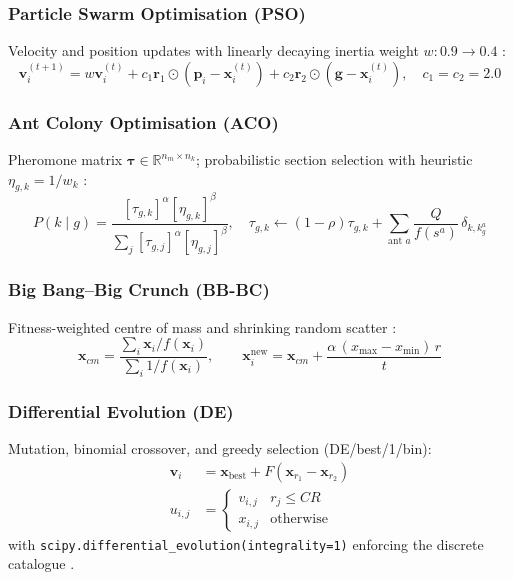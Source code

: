 \documentclass[lineno,pdflatex,sn-mathphys-num]{sn-jnl}
\begin{document}
\subsubsection{Particle Swarm Optimisation (PSO)}
Velocity and position updates with linearly decaying inertia weight
$w: 0.9\to 0.4$ \citep{Perez2007}:
\begin{equation}
  \mathbf{v}_i^{(t+1)} = w\mathbf{v}_i^{(t)}
    + c_1\mathbf{r}_1\odot(\mathbf{p}_i-\mathbf{x}_i^{(t)})
    + c_2\mathbf{r}_2\odot(\mathbf{g}-\mathbf{x}_i^{(t)}),
  \quad c_1=c_2=2.0
  \label{eq:pso}
\end{equation}

\subsubsection{Ant Colony Optimisation (ACO)}
Pheromone matrix $\bm{\tau}\in\mathbb{R}^{n_m\times n_k}$; probabilistic
section selection with heuristic $\eta_{g,k}=1/w_k$
\citep{Camp2004}:
\begin{equation}
  P(k\mid g) = \frac{[\tau_{g,k}]^\alpha[\eta_{g,k}]^\beta}
    {\sum_{j}[\tau_{g,j}]^\alpha[\eta_{g,j}]^\beta},
  \quad
  \tau_{g,k} \leftarrow (1-\rho)\tau_{g,k}
    + \sum_{\text{ant }a}\frac{Q}{f(s^a)}\,\delta_{k,k_g^a}
  \label{eq:aco}
\end{equation}

\subsubsection{Big Bang--Big Crunch (BB-BC)}
Fitness-weighted centre of mass and shrinking random scatter
\citep{Camp2007}:
\begin{equation}
  \mathbf{x}_{cm} = \frac{\sum_i \mathbf{x}_i/f(\mathbf{x}_i)}
    {\sum_i 1/f(\mathbf{x}_i)},
  \qquad
  \mathbf{x}_i^{\mathrm{new}} = \mathbf{x}_{cm}
    + \frac{\alpha\,(x_{\max}-x_{\min})\,r}{t}
  \label{eq:bbbc}
\end{equation}

\subsubsection{Differential Evolution (DE)}
Mutation, binomial crossover, and greedy selection (DE/best/1/bin):
\begin{align}
  \mathbf{v}_i &= \mathbf{x}_{\mathrm{best}}
    + F(\mathbf{x}_{r_1}-\mathbf{x}_{r_2})
    \label{eq:de_mut} \\
  u_{i,j} &= \begin{cases}v_{i,j} & r_j\leq CR\\
    x_{i,j} & \text{otherwise}\end{cases}
    \label{eq:de_cross}
\end{align}
with \texttt{scipy.differential\_evolution(integrality=1)} enforcing
the discrete catalogue \citep{Virtanen2020}.
\end{document}
